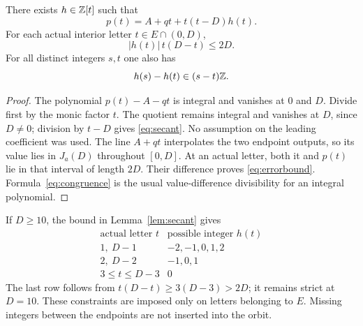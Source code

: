 \begin{lemma}\label{lem:secant}
There exists $h\in\mathbb Z[t]$ such that
\begin{equation}\label{eq:secant}
 p(t)=A+qt+t(t-D)h(t).
\end{equation}
For each actual interior letter $t\in E\cap(0,D)$,
\begin{equation}\label{eq:errorbound}
 |h(t)|\,t(D-t)\le2D.
\end{equation}
For all distinct integers $s,t$ one also has
\begin{equation}\label{eq:congruence}
 h(s)-h(t)\in(s-t)\mathbb Z.
\end{equation}
\end{lemma}
\begin{proof}
The polynomial $p(t)-A-qt$ is integral and vanishes at $0$ and $D$.
Divide first by the monic factor $t$. The quotient remains integral
and vanishes at $D$, since $D\ne0$; division by $t-D$ gives
\eqref{eq:secant}. No assumption on the leading coefficient was used.
The line $A+qt$ interpolates the two endpoint outputs, so its value
lies in $J_a(D)$ throughout $[0,D]$. At an actual letter, both it
and $p(t)$ lie in that interval of length $2D$. Their difference
proves \eqref{eq:errorbound}. Formula~\eqref{eq:congruence} is the
usual value-difference divisibility for an integral polynomial.
\end{proof}

If $D\ge10$, the bound in Lemma~\ref{lem:secant} gives
\begin{equation}\label{eq:endbounds}
 \begin{array}{c|c}
 \text{actual letter }t&\text{possible integer }h(t)\\ \hline
 1,\ D-1&-2,-1,0,1,2\\
 2,\ D-2&-1,0,1\\
 3\le t\le D-3&0
 \end{array}
\end{equation}
The last row follows from $t(D-t)\ge3(D-3)>2D$; it remains strict
at $D=10$. These constraints are imposed only on letters belonging
to $E$. Missing integers between the endpoints are not inserted into
the orbit.
